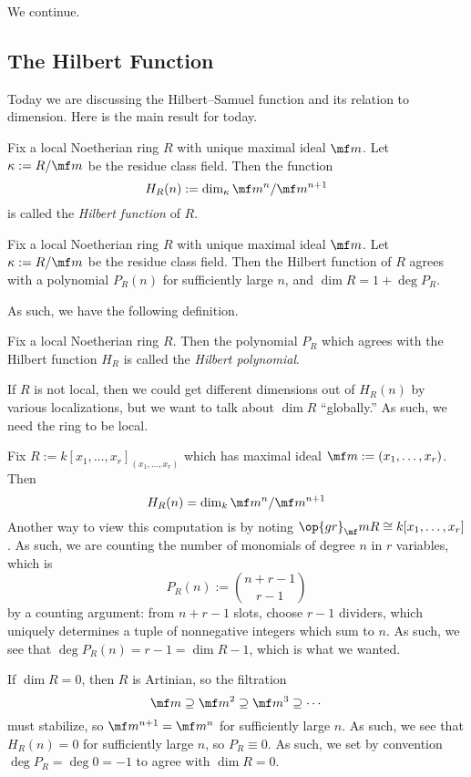 \documentclass[../notes.tex]{subfiles}
\begin{document}

We continue.

\subsection{The Hilbert Function}
Today we are discussing the Hilbert--Samuel function and its relation to dimension. Here is the main result for today.
\begin{definition}
	Fix a local Noetherian ring $R$ with unique maximal ideal $\mf m$. Let $\kappa:=R/\mf m$ be the residue class field. Then the function
	\[H_R(n):=\dim_\kappa\mf m^n/\mf m^{n+1}\]
	is called the \textit{Hilbert function} of $R$.
\end{definition}
\begin{theorem} \label{thm:hilpoly}
	Fix a local Noetherian ring $R$ with unique maximal ideal $\mf m$. Let $\kappa:=R/\mf m$ be the residue class field. Then the Hilbert function of $R$ agrees with a polynomial $P_R(n)$ for sufficiently large $n$, and $\dim R=1+\deg P_R$.
\end{theorem}
As such, we have the following definition.
\begin{definition}
	Fix a local Noetherian ring $R$. Then the polynomial $P_R$ which agrees with the Hilbert function $H_R$ is called the \textit{Hilbert polynomial}.
\end{definition}
\begin{remark}
	If $R$ is not local, then we could get different dimensions out of $H_R(n)$ by various localizations, but we want to talk about $\dim R$ ``globally.'' As such, we need the ring to be local.
\end{remark}
\begin{example}
	Fix $R:=k[x_1,\ldots,x_r]_{(x_1,\ldots,x_r)}$ which has maximal ideal $\mf m:=(x_1,\ldots,x_r)$. Then
	\[H_R(n)=\dim_k\mf m^n/\mf m^{n+1}\]
	Another way to view this computation is by noting $\op{gr}_\mf mR\cong k[x_1,\ldots,x_r]$. As such, we are counting the number of monomials of degree $n$ in $r$ variables, which is
	\[P_R(n):=\binom{n+r-1}{r-1}\]
	by a counting argument: from $n+r-1$ slots, choose $r-1$ dividers, which uniquely determines a tuple of nonnegative integers which sum to $n$. As such, we see that $\deg P_R(n)=r-1=\dim R-1$, which is what we wanted.
\end{example}
\begin{example} \label{ex:dimzerohilpoly}
	If $\dim R=0$, then $R$ is Artinian, so the filtration
	\[\mf m\supseteq\mf m^2\supseteq\mf m^3\supseteq\cdots\]
	must stabilize, so $\mf m^{n+1}=\mf m^n$ for sufficiently large $n$. As such, we see that $H_R(n)=0$ for sufficiently large $n$, so $P_R\equiv0$. As such, we set by convention $\deg P_R=\deg0=-1$ to agree with $\dim R=0$.
\end{example}
\end{document}
